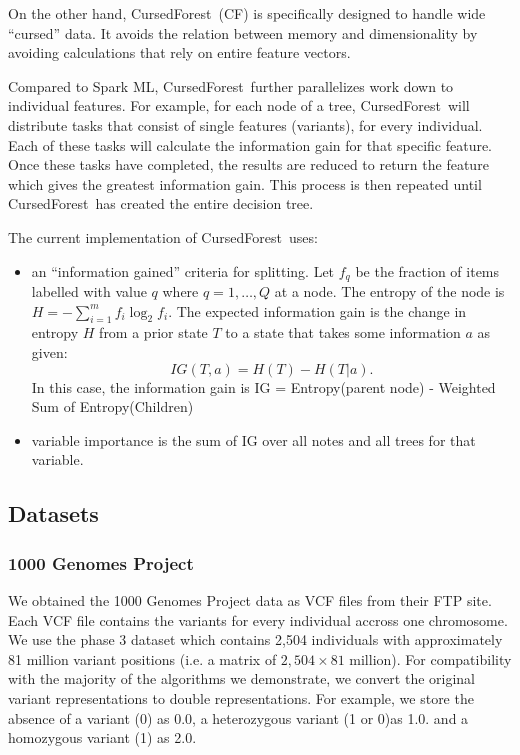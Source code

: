 \documentclass[10pt,letterpaper]{article}
\newcommand{\cursedforest}{{\sc CursedForest}}
\begin{document}
On the other hand, \cursedforest\ (CF) is specifically designed to handle wide ``cursed'' data. It avoids the relation
between memory and dimensionality by avoiding calculations that rely on entire feature vectors.

Compared to Spark ML, \cursedforest\ further parallelizes work down to individual features.  For example, for each node of
a tree, \cursedforest\ will distribute tasks that consist of single features (variants), for every individual.  Each of
these tasks will calculate the information gain for that specific feature.  Once these tasks have completed, the results
are reduced to return the feature which gives the greatest information gain.  This process is then repeated until
\cursedforest\ has created the entire decision tree.

The current implementation of \cursedforest\ uses:
\begin{itemize}
\item an ``information gained'' criteria for splitting. Let $f_q$ be the fraction of items labelled with value $q$ where $q = 1,
  \ldots, Q$ at a node. The entropy of the node is $H = - \sum^{m}_{i=1} f_i \log^{}_2 f_i.$
The expected information gain is the change in entropy $H$ from a prior state $T$ to a state that takes some
information $a$ as given: 
\[ IG(T,a) = H(T) - H(T|a). \]
In this case, the information gain is IG = Entropy(parent node) - Weighted Sum of Entropy(Children)
\item variable importance is the sum of IG over all notes and all trees for that variable.
\end{itemize}


\subsection{Datasets}
\subsubsection{1000 Genomes Project}
We obtained the 1000 Genomes Project data as VCF files from their FTP site.  Each VCF file contains the variants for every individual accross one chromosome.  
We use the phase 3 dataset which contains 2,504 individuals with approximately 81 million variant positions (i.e. a matrix of $2,504 \times 81$ million).  
For compatibility with the majority of the algorithms we demonstrate, we convert the original variant representations to double representations.  
For example, we store the absence of a variant (0) as 0.0, a heterozygous variant (1 or 0)as 1.0. and a homozygous variant (1) as 2.0.
\end{document}

